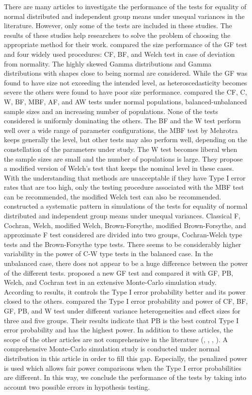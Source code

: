 There are many articles to investigate the performance of the tests for equality of normal distributed and independent group means under unequal variances in the literature. However, only some of the tests are included in these studies. The results of these studies help researchers to solve the problem of choosing the appropriate method for their work. \cite{gamage:1998} compared the size performance of the GF test and four widely used procedures: CF, BF, and Welch test in case of deviation from normality. The highly skewed Gamma distributions and Gamma distributions with shapes close to being normal are considered. While the GF was found to have size not exceeding the intended level, as heteroscedasticity becomes severe the others were found to have poor size performance. \cite{hartung:2002} compared the CF, C, W, BF, MBF, AF, and AW tests under normal populations, balanced-unbalanced sample sizes and an increasing number of populations. None of the tests considered is uniformly dominating the others. The BF and the W test perform well over a wide range of parameter configurations, the MBF test by Mehrotra keeps generally the level, but other tests may also perform well, depending on the constellation of the parameters under study. The W test becomes liberal when the sample sizes are small and the number of populations is large. They propose a modified version of Welch's test that keeps the nominal level in these cases. With the understanding that methods are unacceptable if they have Type I error rates that are too high, only the testing procedure associated with the MBF test can be recommended, the modified Welch test can also be recommended. \cite{argac:2004} constructed a systematic pattern in simulations of the tests for equality of normal distributed and independent group means under unequal variances. Classical F, Cochran, Welch, modified Welch, Brown-Forsythe, modified Brown-Forsythe, and approximate F test considered are divided into two groups, Cochran-Welch type tests and the Brown-Forsythe type tests. There seems to be considerably higher variability in the power of C-W type tests in the balanced case. In the unbalanced case, there does not appear to be a huge difference between the power of the different tests. \cite{alvandi:2012} proposed a new GF test and compared it with GF, PB, Welch, and Cochran test in an extensive Monte-Carlo simulation study. According to results, it controls the Type I error probability better and its power closed to the others. \cite{gokpinar:2012} compared the Type I error probability and power of CF, BF, GF, PB, and W test under different variance heterogeneities and effect sizes for three and five groups. Their results indicate that PB is the best control Type I error probability and has the highest power. In addition to these articles, the scope of the other articles are not comprehensive in the literature (\cite{hartung:2002}, \cite{lee:2003}, \cite{li:2011}, \cite{mutlu:2017}). A comprehensive Monte-Carlo simulation study is conducted under normal distribution in this article in order to fill this gap. Especially, the penalized power is used which allows fair power comparisons when the Type I error probabilities are different. In this way, we conclude the performance of the tests by taking into account two possible errors in hypothesis testing.

